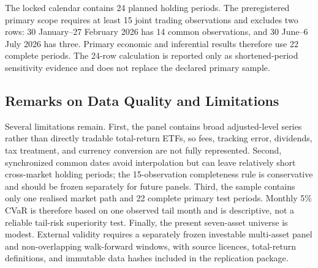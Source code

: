 The locked calendar contains 24 planned holding periods. The preregistered primary scope requires at least 15 joint trading observations and excludes two rows: 30 January--27 February 2026 has 14 common observations, and 30 June--6 July 2026 has three. Primary economic and inferential results therefore use 22 complete periods. The 24-row calculation is reported only as shortened-period sensitivity evidence and does not replace the declared primary sample.

\subsection{Remarks on Data Quality and Limitations}
\label{subsec:4_remarks}

Several limitations remain. First, the panel contains broad adjusted-level series rather than directly tradable total-return ETFs, so fees, tracking error, dividends, tax treatment, and currency conversion are not fully represented. Second, synchronized common dates avoid interpolation but can leave relatively short cross-market holding periods; the 15-observation completeness rule is conservative and should be frozen separately for future panels. Third, the sample contains only one realised market path and 22 complete primary test periods. Monthly 5\% CVaR is therefore based on one observed tail month and is descriptive, not a reliable tail-risk superiority test. Finally, the present seven-asset universe is modest. External validity requires a separately frozen investable multi-asset panel and non-overlapping walk-forward windows, with source licences, total-return definitions, and immutable data hashes included in the replication package.
